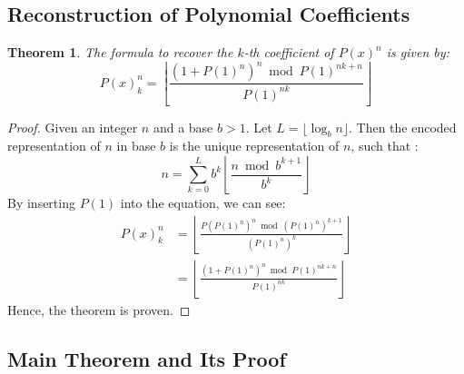 \documentclass{article}
\theoremstyle{plain}
\newtheorem{thm}{Theorem}
\begin{document}
\subsection{Reconstruction of Polynomial Coefficients}

\begin{thm}
\label{thm:3}
The formula to recover the $k$-th coefficient of $P(x)^{n}$ is given by:
\begin{equation}
P(x)^{n}_{k} = \left\lfloor\frac{(1 + P(1)^{n})^{n} \bmod P(1)^{n k + n}}{P(1)^{n k}}\right\rfloor
\end{equation}
\end{thm}

\begin{proof}
Given an integer $n$ and a base $b > 1$. Let $L = \lfloor \log_b{n} \rfloor$. Then the encoded representation of $n$ in base $b$ is the unique representation of $n$, such that \cite{cormen2009introduction}:
\begin{equation}
n = \sum_{k=0}^{L} b^{k} \left\lfloor\frac{n \bmod b^{k+1}}{b^{k}}\right\rfloor 
\end{equation}
By inserting $P(1)$ into the equation, we can see:
\begin{align}
    P(x)^{n}_{k} &= \left\lfloor\frac{P(P(1)^{n})^{n} \bmod (P(1)^{n})^{k+1}}{(P(1)^{n})^{k}}\right\rfloor \\
    &= \left\lfloor\frac{(1 + P(1)^{n})^{n} \bmod P(1)^{n k + n}}{P(1)^{n k}}\right\rfloor
\end{align}
Hence, the theorem is proven.
\end{proof}

\subsection{Main Theorem and Its Proof}
\end{document}
